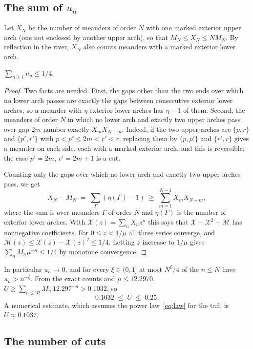 \subsection{The sum of \texorpdfstring{$u_n$}{u\_n}}

Let $X_N$ be the number of meanders of order $N$ with one marked exterior upper arch (one not
enclosed by another upper arch), so that $M_N\le X_N\le NM_N$. By reflection in the river, $X_N$ also counts meanders with a marked exterior
lower arch.

\begin{theorem}\label{thm:sumu}
$\sum_{n\ge1}u_n\le1/4$.
\end{theorem}

\begin{proof}
Two facts are needed. First, the gaps other than the two ends over which no lower arch passes are
exactly the gaps between consecutive exterior lower arches, so a meander with $\eta$ exterior lower arches has $\eta-1$ of them.
Second, the meanders of order $N$ in which no lower arch and exactly two upper arches pass over gap
$2m$ number exactly $X_mX_{N-m}$. Indeed, if the two upper arches are $\{p,r\}$ and $\{p',r'\}$ with
$p<p'\le2m<r'<r$, replacing them by $\{p,p'\}$ and $\{r',r\}$ gives a meander on each side, each with a
marked exterior arch, and this is reversible; the case $p'=2m$, $r'=2m+1$ is a cut.

Counting only the gaps over which no lower arch and exactly two upper arches pass, we get
\[ X_N-M_N\;=\;\sum_\Gamma(\eta(\Gamma)-1)\;\ge\;\sum_{m=1}^{N-1}X_mX_{N-m}, \]
where the sum is over meanders $\Gamma$ of order $N$ and $\eta(\Gamma)$ is the number of exterior lower
arches.
With $\mathcal X(z)=\sum_nX_nz^n$ this says that $\mathcal X-\mathcal X^2-\mathcal M$ has
nonnegative coefficients. For $0\le z<1/\mu$ all three series converge, and
$\mathcal M(z)\le\mathcal X(z)-\mathcal X(z)^2\le1/4$. Letting $z$ increase to $1/\mu$ gives
$\sum_nM_n\mu^{-n}\le1/4$ by monotone convergence.
\end{proof}

In particular $u_n\to0$, and for every $\xi\in(0,1]$ at most $N^\xi/4$ of the $n\le N$ have
$u_n>n^{-\xi}$. From the exact counts and $\mu\le12.2970$, $U\ge\sum_{n\le32}M_n\,12.297^{-n}>0.1032$, so
\[ 0.1032\;\le\;U\;\le\;0.25 . \]
A numerical estimate, which assumes the power law~\eqref{eq:law} for the tail, is $U\approx0.1037$.

\subsection{The number of cuts}


